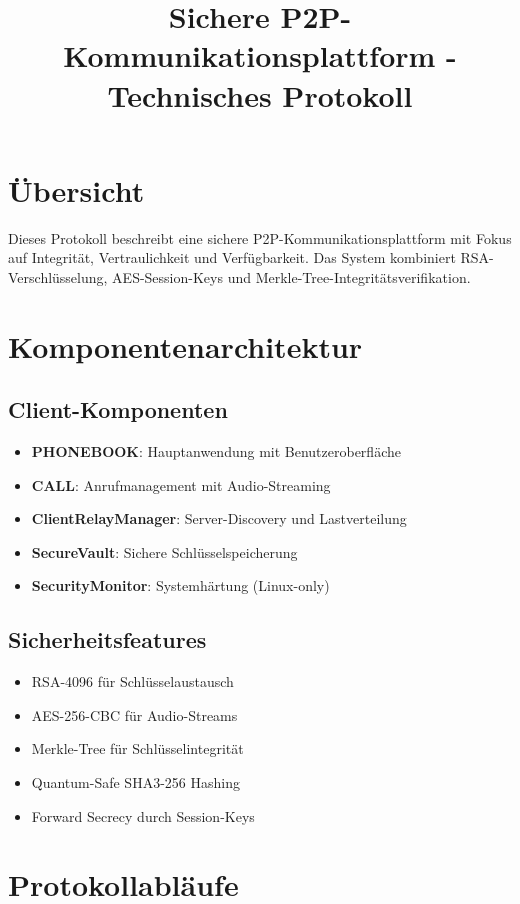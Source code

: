 \documentclass[10pt,a4paper]{article}
\title{Sichere P2P-Kommunikationsplattform - Technisches Protokoll}
\author{}
\date{}
\begin{document}
\maketitle

\section*{Übersicht}
Dieses Protokoll beschreibt eine sichere P2P-Kommunikationsplattform mit Fokus auf Integrität, Vertraulichkeit und Verfügbarkeit. Das System kombiniert RSA-Verschlüsselung, AES-Session-Keys und Merkle-Tree-Integritätsverifikation.

\section{Komponentenarchitektur}

\subsection{Client-Komponenten}
\begin{itemize}[left=0pt]
\item \textbf{PHONEBOOK}: Hauptanwendung mit Benutzeroberfläche
\item \textbf{CALL}: Anrufmanagement mit Audio-Streaming
\item \textbf{ClientRelayManager}: Server-Discovery und Lastverteilung
\item \textbf{SecureVault}: Sichere Schlüsselspeicherung
\item \textbf{SecurityMonitor}: Systemhärtung (Linux-only)
\end{itemize}

\subsection{Sicherheitsfeatures}
\begin{itemize}[left=0pt]
\item RSA-4096 für Schlüsselaustausch
\item AES-256-CBC für Audio-Streams
\item Merkle-Tree für Schlüsselintegrität
\item Quantum-Safe SHA3-256 Hashing
\item Forward Secrecy durch Session-Keys
\end{itemize}

\section{Protokollabläufe}
\end{document}
